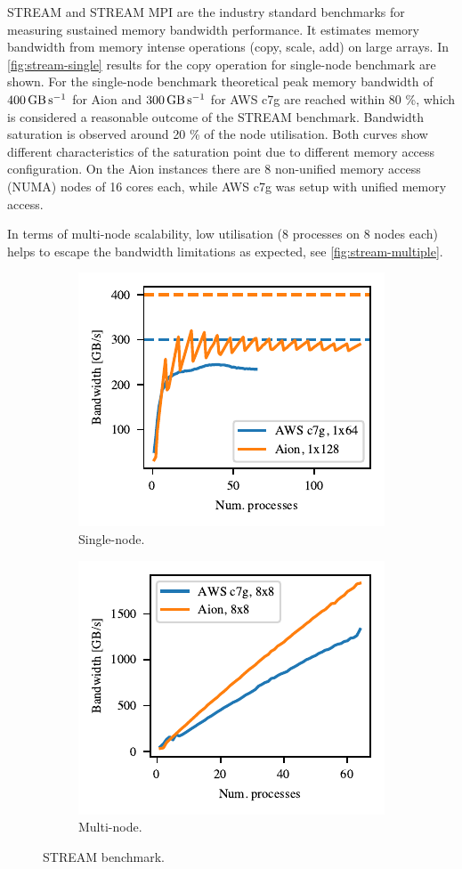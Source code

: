 STREAM and STREAM MPI \cite{McCalpin1995,McCalpin2007} are the industry standard
benchmarks for measuring sustained memory bandwidth performance. It estimates
memory bandwidth from memory intense operations (copy, scale, add) on large
arrays. In \autoref{fig:stream-single} results for the copy operation for
single-node benchmark are shown. For the single-node benchmark theoretical peak
memory bandwidth of $\SI{400}{\giga\byte\per\second}$ for Aion and
$\SI{300}{\giga\byte\per\second}$ for AWS c7g are reached within 80 \%, which is
considered a reasonable outcome of the STREAM benchmark. Bandwidth saturation is
observed around 20 \% of the node utilisation. Both curves show different
characteristics of the saturation point due to different memory access
configuration. On the Aion instances there are 8 non-unified memory access
(NUMA) nodes of 16 cores each, while AWS c7g was setup with unified memory
access.

In terms of multi-node scalability, low utilisation (8 processes on 8 nodes
each) helps to escape the bandwidth limitations as expected, see
\autoref{fig:stream-multiple}.

\begin{figure}
    \begin{subfigure}{.5\textwidth}
        \includegraphics{chapters/chp1/graphics/stream_plots/stream_single_node.pdf}
        \caption{Single-node.}
        \label{fig:stream-single}
    \end{subfigure}%
    \begin{subfigure}{.5\textwidth}
        \includegraphics{chapters/chp1/graphics/stream_plots/stream_multi_node.pdf}
        \caption{Multi-node.}
        \label{fig:stream-multiple}
    \end{subfigure}
    \caption{STREAM benchmark.}
\end{figure}

